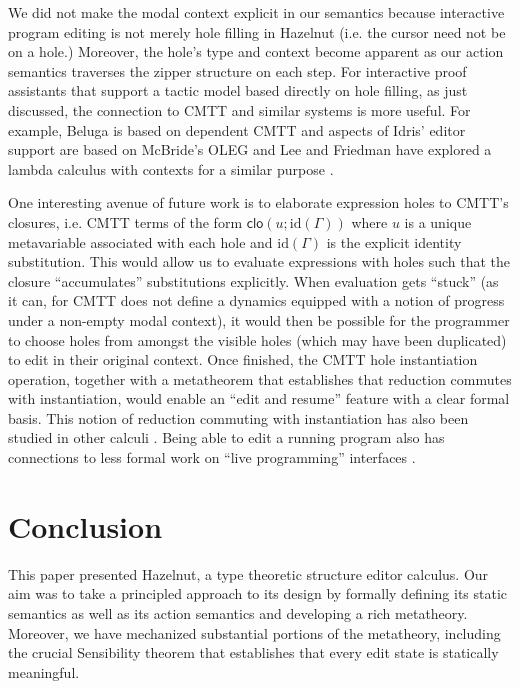 \documentclass[9pt]{sigplanconf}
\begin{document}
We did not make the modal context explicit in our semantics because interactive program editing is not
merely hole filling in Hazelnut (i.e. the cursor need not be on a
hole.) Moreover, the hole's type and context become apparent as our action
semantics traverses the zipper structure on each step. For interactive
proof assistants that support a tactic model based directly on hole
filling, as just discussed, the connection to CMTT and similar systems is more useful. For
example, Beluga \cite{DBLP:conf/flops/Pientka10} is based on dependent CMTT
and aspects of Idris' editor support \cite{brady2013idris} are based on
McBride's OLEG \cite{mcbride2000dependently} and Lee and Friedman have
explored a lambda calculus with contexts for a similar
purpose \cite{DBLP:conf/icfp/LeeF96}.

One interesting avenue of future work is to elaborate expression holes to
CMTT's closures, i.e. CMTT terms of the form
$\mathsf{clo}(u; \text{id}(\Gamma))$ where $u$ is a unique metavariable
associated with each hole and $\text{id}(\Gamma)$ is the explicit identity
substitution. This would allow us to evaluate expressions with holes such
that the closure ``accumulates'' substitutions explicitly. When evaluation
gets ``stuck'' (as it can, for CMTT does not define a dynamics equipped
with a notion of progress under a non-empty modal context), it would then
be possible for the programmer to choose holes from amongst the visible
holes (which may have been duplicated) to edit in their original
context. Once finished, the CMTT hole instantiation operation, together
with a metatheorem that establishes that reduction commutes with
instantiation, would enable an ``edit and resume'' feature with a clear
formal basis. This notion of reduction commuting with instantiation has
also been studied in other
calculi \cite{DBLP:journals/entcs/Sands97}. Being able to edit a running
program also has connections to less formal work on ``live programming''
interfaces \cite{burckhardt2013s,lamdu}.

\section{Conclusion}
\label{sec:future}
This paper presented Hazelnut, a type theoretic structure editor
calculus. Our aim was to take a principled approach to its design by
formally defining its static semantics as well as its action semantics and
developing a rich metatheory. Moreover, we have mechanized substantial
portions of the metatheory, including the crucial Sensibility theorem that
establishes that every edit state is statically meaningful.
\end{document}
